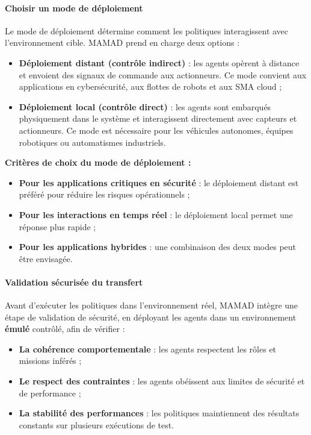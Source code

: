 \paragraph{Choisir un mode de déploiement}

Le mode de déploiement détermine comment les politiques interagissent avec l'environnement cible. MAMAD prend en charge deux options :

\begin{itemize}
    \item \textbf{Déploiement distant (contrôle indirect)} : les agents opèrent à distance et envoient des signaux de commande aux actionneurs. Ce mode convient aux applications en cybersécurité, aux flottes de robots et aux SMA cloud ;
          
    \item \textbf{Déploiement local (contrôle direct)} : les agents sont embarqués physiquement dans le système et interagissent directement avec capteurs et actionneurs. Ce mode est nécessaire pour les véhicules autonomes, équipes robotiques ou automatismes industriels.
\end{itemize}

\vspace{0.4em}
\noindent \textbf{Critères de choix du mode de déploiement :}
\begin{itemize}
    \item \textbf{Pour les applications critiques en sécurité} : le déploiement distant est préféré pour réduire les risques opérationnels ;
    \item \textbf{Pour les interactions en temps réel} : le déploiement local permet une réponse plus rapide ;
    \item \textbf{Pour les applications hybrides} : une combinaison des deux modes peut être envisagée.
\end{itemize}

\paragraph{Validation sécurisée du transfert}

Avant d'exécuter les politiques dans l'environnement réel, MAMAD intègre une étape de validation de sécurité, en déployant les agents dans un environnement \textbf{émulé} contrôlé, afin de vérifier :

\begin{itemize}
    \item \textbf{La cohérence comportementale} : les agents respectent les rôles et missions inférés ;
    \item \textbf{Le respect des contraintes} : les agents obéissent aux limites de sécurité et de performance ;
    \item \textbf{La stabilité des performances} : les politiques maintiennent des résultats constants sur plusieurs exécutions de test.
\end{itemize}

